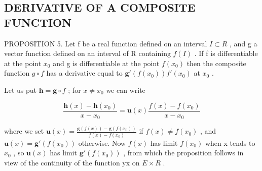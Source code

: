 \subsection{DERIVATIVE OF A COMPOSITE FUNCTION}

PROPOSITION 5. Let f be a real function defined on an interval \(I \subset R\) , and g a vector function defined on an interval of R containing \(f(I)\) . If f is differentiable at the point \(x_{0}\) and g is differentiable at the point \(f(x_{0})\) then the composite function \(g \circ f\) has a derivative equal to \(\mathbf{g}'(f(x_{0}))f'(x_{0})\) at \(x_{0}\) .

Let us put \(\mathbf{h} = \mathbf{g} \circ f\) ; for \(x \neq x_0\) we can write

\[
\frac {\mathbf {h} (x) - \mathbf {h} (x _ {0})}{x - x _ {0}} = \mathbf {u} (x) \frac {f (x) - f (x _ {0})}{x - x _ {0}}
\]

where we set \(\mathbf{u}(x)=\frac{\mathbf{g}(f(x))-\mathbf{g}(f(x_{0}))}{f(x)-f(x_{0})}\) if \(f(x)\neq f(x_{0})\) , and \(\mathbf{u}(x)=\mathbf{g}'(f(x_{0}))\) otherwise. Now \(f(x)\) has limit \(f(x_{0})\) when x tends to \(x_{0}\) , so \(\mathbf{u}(x)\) has limit \(\mathbf{g}'(f(x_{0}))\) , from which the proposition follows in view of the continuity of the function yx on \(E\times R\) .

